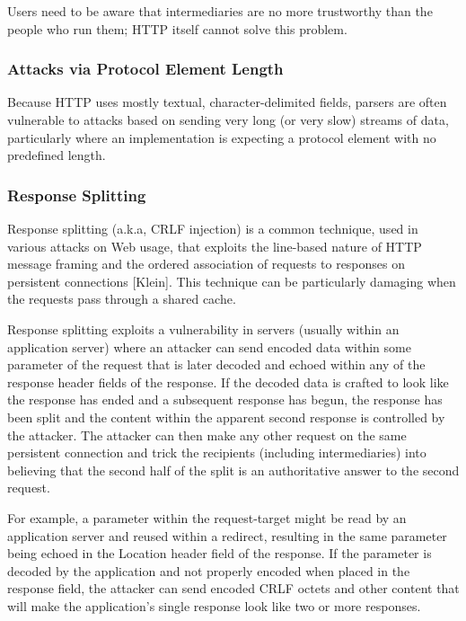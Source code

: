 Users need to be aware that intermediaries are no more trustworthy
than the people who run them; HTTP itself cannot solve this problem.

\subsubsection{Attacks via Protocol Element Length}

Because HTTP uses mostly textual, character-delimited fields, parsers
are often vulnerable to attacks based on sending very long (or very
slow) streams of data, particularly where an implementation is
expecting a protocol element with no predefined length.



\subsubsection{Response Splitting}

Response splitting (a.k.a, CRLF injection) is a common technique,
used in various attacks on Web usage, that exploits the line-based
nature of HTTP message framing and the ordered association of
requests to responses on persistent connections [Klein].  This
technique can be particularly damaging when the requests pass through
a shared cache.

Response splitting exploits a vulnerability in servers (usually
within an application server) where an attacker can send encoded data
within some parameter of the request that is later decoded and echoed
within any of the response header fields of the response.  If the
decoded data is crafted to look like the response has ended and a
subsequent response has begun, the response has been split and the
content within the apparent second response is controlled by the
attacker.  The attacker can then make any other request on the same
persistent connection and trick the recipients (including
intermediaries) into believing that the second half of the split is
an authoritative answer to the second request.

For example, a parameter within the request-target might be read by
an application server and reused within a redirect, resulting in the
same parameter being echoed in the Location header field of the
response.  If the parameter is decoded by the application and not
properly encoded when placed in the response field, the attacker can
send encoded CRLF octets and other content that will make the
application's single response look like two or more responses.


